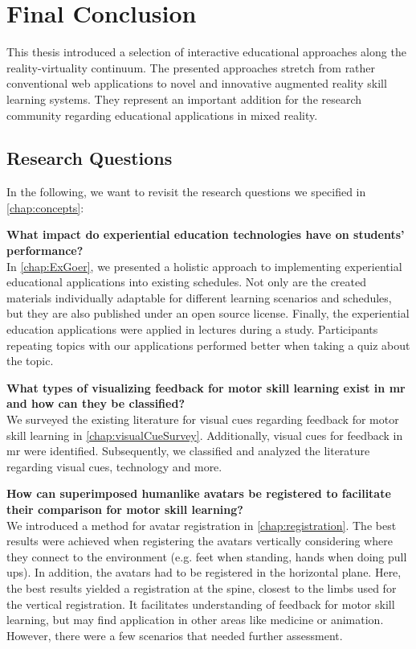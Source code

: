 %
\chapter{Final Conclusion}
\label{chap:conclusion}

This thesis introduced a selection of interactive educational approaches along the reality-virtuality continuum.
The presented approaches stretch from rather conventional web applications to novel and innovative augmented reality skill learning systems.
They represent an important addition for the research community regarding educational applications in mixed reality.

\section{Research Questions \label{sec:questions}}
In the following, we want to revisit the research questions we specified in \autoref{chap:concepts}:

\textbf{What impact do experiential education technologies have on students' performance?}\\
In \autoref{chap:ExGoer}, we presented a holistic approach to implementing experiential educational applications into existing schedules.
Not only are the created materials individually adaptable for different learning scenarios and schedules, but they are also published under an open source license.
Finally, the experiential education applications were applied in lectures during a study.
Participants repeating topics with our applications performed better when taking a quiz about the topic.

\textbf{What types of visualizing feedback for motor skill learning exist in \acrlong{mr} and how can they be classified?}\\
We surveyed the existing literature for visual cues regarding feedback for motor skill learning in \autoref{chap:visualCueSurvey}.
Additionally, visual cues for feedback in \acrshort{mr} were identified.
Subsequently, we classified and analyzed the literature regarding visual cues, technology and more.

\textbf{How can superimposed humanlike avatars be registered to facilitate their comparison for motor skill learning?}\\
We introduced a method for avatar registration in \autoref{chap:registration}.
The best results were achieved when registering the avatars vertically considering where they connect to the environment (e.g. feet when standing, hands when doing pull ups).
In addition, the avatars had to be registered in the horizontal plane.
Here, the best results yielded a registration at the spine, closest to the limbs used for the vertical registration.
It facilitates understanding of feedback for motor skill learning, but may find application in other areas like medicine or animation.
However, there were a few scenarios that needed further assessment.

